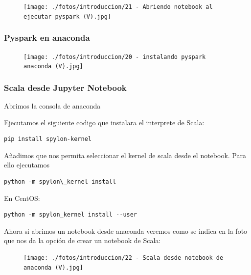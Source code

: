 \documentclass[a4paper,10pt]{article}
\begin{document}
\begin{figure}[H]
\begin{center}
\texttt{[image: ./fotos/introduccion/21 - Abriendo notebook al ejecutar pyspark (V).jpg]}
\end{center}
\end{figure}

\subsubsection{Pyspark en anaconda}

\begin{figure}[H]
\begin{center}
\texttt{[image: ./fotos/introduccion/20 - instalando pyspark anaconda (V).jpg]}
\end{center}
\end{figure}

\subsubsection{Scala desde Jupyter Notebook}

Abrimos la consola de anaconda 

Ejecutamos el siguiente codigo que instalara el interprete de Scala:

\lstset{language=bash, breaklines=true, basicstyle=\ttfamily}
\begin{lstlisting}[frame=single]
pip install spylon-kernel 
\end{lstlisting}

Añadimos que nos permita seleccionar el kernel de scala desde el notebook. Para ello ejecutamos

\lstset{language=bash, breaklines=true, basicstyle=\ttfamily}
\begin{lstlisting}[frame=single]
python -m spylon\_kernel install
\end{lstlisting}


En CentOS:

\lstset{language=bash, breaklines=true, basicstyle=\ttfamily}
\begin{lstlisting}[frame=single]
python -m spylon_kernel install --user
\end{lstlisting}

Ahora si abrimos un notebook desde anaconda veremos como se indica en la foto que nos da la opción de crear un notebook de Scala: 

\begin{figure}[H]
\begin{center}
\texttt{[image: ./fotos/introduccion/22 - Scala desde notebook de anaconda (V).jpg]}
\end{center}
\end{figure}
\end{document}
